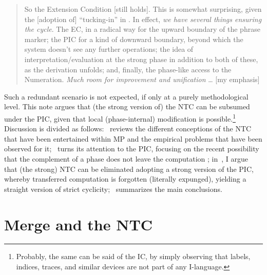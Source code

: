 \documentclass[output=paper]{langsci/langscibook}
\begin{document}
\blockquote{So the Extension Condition [still holds]. This is somewhat
    surprising, given the [adoption of] “tucking-in” in \citet{Chomsky2000}. In
    effect, \emph{we have several things ensuring the cycle}. The
    \gls{EC}, in a radical way for the upward boundary of the
    phrase marker; the \gls{PIC} for a kind of downward boundary, beyond which
    the system doesn’t see any further operations; the idea of
    interpretation/evaluation at the strong phase in addition to both of these,
as the derivation unfolds; and, finally, the phase-like access to the
Numeration.  \emph{Much room for improvement and unification} \dots{} [my
emphasis]}

Such a redundant scenario is not expected, if only at a purely methodological
level. This note argues that (the strong version of) the \gls{NTC} can be
subsumed under the \gls{PIC}, given that local (phase-internal) modification is
possible.\footnote{Probably, the same can be said of the \gls{IC}, by simply
observing that labels, indices, traces, and similar devices are not part of any
I-language.} Discussion is divided as follows:~ reviews the different
conceptions of the \gls{NTC} that have been entertained within \gls{MP} and the
empirical problems that have been observed for it;~ turns its
attention to the \gls{PIC}, focusing on the recent possibility that the
complement of a phase does not leave the computation
\parencite{Chomsky2008,Chomsky2016}; in~, I argue that (the strong)
\gls{NTC} can be eliminated adopting a strong version of the \gls{PIC}, whereby
transferred computation is forgotten (literally expunged), yielding a straight
version of strict cyclicity;~ summarizes the main conclusions.

\section{Merge and the NTC}\label{sec:34.2}
\end{document}
